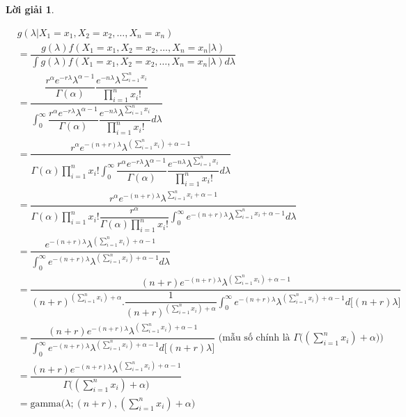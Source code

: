 \documentclass[14pt, a4paper]{article}
\theoremstyle{sltheorem}
\theoremstyle{soltheorem}
\newtheorem*{loigiai}{Lời giải}
\begin{document}
\begin{loigiai}
\begin{enumerate}
\begin{enumerate}[label=(\alph*)]
            \begin{equation*}
                \begin{aligned}
                    &g(\lambda \vert X_1 =x_1, X_2=x_2, \dots, X_n=x_n) \\
                    &= \dfrac{g(\lambda) f(X_1=x_1,X_2=x_2,\dots, X_n=x_n \vert \lambda)}{\int g(\lambda) f(X_1=x_1,X_2=x_2,\dots, X_n=x_n \vert \lambda) d \lambda} \\
                    &= \dfrac{\dfrac{r^{\alpha}e^{-r\lambda} \lambda^{\alpha - 1}}{\Gamma(\alpha)} \dfrac{e^{-n\lambda} \lambda^{\sum_{i=1}^n x_i}}{\prod_{i=1}^n x_i!}}{\displaystyle \int_{0}^{\infty} \dfrac{r^{\alpha}e^{-r\lambda} \lambda^{\alpha - 1}}{\Gamma(\alpha)}  \dfrac{e^{-n\lambda}\lambda^{\sum_{i=1}^n x_i}}{\prod_{i=1}^n x_i!} d \lambda} \\
                    &= \dfrac{r^{\alpha}e^{-(n+r)\lambda} \lambda^{(\sum_{i=1}^n x_i) + \alpha - 1}}{\Gamma(\alpha)\prod_{i=1}^n x_i! \displaystyle \int_{0}^{\infty} \dfrac{r^{\alpha}e^{-r\lambda} \lambda^{\alpha - 1}}{\Gamma(\alpha)}  \dfrac{e^{-n\lambda}\lambda^{\sum_{i=1}^n x_i}}{\prod_{i=1}^n x_i!} d \lambda} \\
                    &= \dfrac{r^{\alpha}e^{-(n+r)\lambda} \lambda^{\sum_{i=1}^n x_i + \alpha - 1}}{\Gamma(\alpha)\prod_{i=1}^n x_i! \dfrac{r^{\alpha}}{\Gamma(\alpha)\prod_{i=1}^n x_i!} \displaystyle \int_{0}^{\infty} e^{-(n+r)\lambda} \lambda^{\sum_{i=1}^n x_i + \alpha - 1} d \lambda} \\
                    &= \dfrac{e^{-(n+r)\lambda} \lambda^{(\sum_{i=1}^n x_i) + \alpha - 1}}{\displaystyle \int_{0}^{\infty} e^{-(n+r)\lambda} \lambda^{(\sum_{i=1}^n x_i) + \alpha - 1} d \lambda} \\
                    &= \dfrac{(n+r)e^{-(n+r)\lambda}\lambda^{(\sum_{i=1}^n x_i) + \alpha - 1}}{(n+r)^{(\sum_{i=1}^n x_i) + \alpha} .\dfrac{1}{(n+r)^{(\sum_{i=1}^n x_i) + \alpha}}\displaystyle\int_{0}^{\infty}e^{-(n+r)\lambda}\lambda^{(\sum_{i=1}^n x_i) + \alpha - 1}d\lbrack (n+r)\lambda \rbrack} \\
                    &= \dfrac{(n+r)e^{-(n+r)\lambda}\lambda^{(\sum_{i=1}^n x_i) + \alpha - 1}}{\displaystyle\int_{0}^{\infty}e^{-(n+r)\lambda}\lambda^{(\sum_{i=1}^n x_i) + \alpha - 1}d\lbrack (n+r)\lambda \rbrack} \text{ (mẫu số chính là } \Gamma\big( (\sum_{i=1}^n x_i) + \alpha \big)) \\
                    &= \dfrac{(n+r)e^{-(n+r)\lambda}\lambda^{(\sum_{i=1}^n x_i) + \alpha - 1}}{\Gamma\big( (\sum_{i=1}^n x_i) + \alpha \big)} \\
                    &= \text{gamma}\big(\lambda; (n+r), (\sum_{i=1}^n x_i) + \alpha \big)
                \end{aligned}
            \end{equation*}


\end{enumerate}
\end{enumerate}
\end{loigiai}
\end{document}
